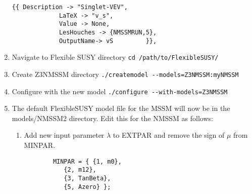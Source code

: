 \documentclass[final,3p,times,pdflatex]{elsarticle}
\newcommand{\code}[1]{\lstinline|#1|}  %
\begin{document}
\begin{enumerate}
\begin{lstlisting}
{{ Description -> "Singlet-VEV", 
			 LaTeX -> "v_s",
             Value -> None, 
             LesHouches -> {NMSSMRUN,5},
             OutputName-> vS         }},
\end{lstlisting}
\item Navigate to Flexible SUSY directory  \code{cd /path/to/FlexibleSUSY/}
\item Create Z3NMSSM directory \code{./createmodel --models=Z3NMSSM:myNMSSM}
\item Configure with the new model \code{./configure --with-models=Z3NMSSM}
\item The default FlexibleSUSY model file for the MSSM will now be in the models/NMSSM2 directory.  Edit this for the NMSSM as follows:
  \begin{enumerate} 
    \item Add new input parameter $\lambda$ to EXTPAR and remove the sign of $\mu$ from MINPAR.
      \begin{lstlisting}    
        MINPAR = { {1, m0},
           {2, m12},
           {3, TanBeta},
           {5, Azero} };


\end{lstlisting}
\end{enumerate}
\end{enumerate}
\end{document}
